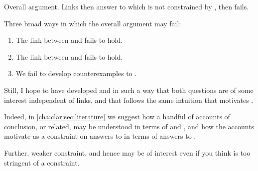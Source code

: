 \begin{note}
  Overall argument.
  Links then answer to \qWhyVnP{} which is not constrained by \qHowV{}, then \issueInclusion{} fails.

  Three broad ways in which the overall argument may fail:
  \begin{enumerate}[label=\arabic*., ref=(\arabic*), noitemsep]
  \item
    The link between \qWhyVnP{} and \qHowV{} fails to hold.
  \item
    The link between \qHowV{} and \qHow{} fails to hold.
  \item
    We fail to develop counterexamples to \issueConstraint{}.
  \end{enumerate}

  Still, I hope to have developed \qWhyVnP{} and \qHowV{} in such a way that both questions are of some interest independent of links, and that \issueConstraint{} follows the same intuition that motivates \issueInclusion{}.

  Indeed, in \autoref{cha:clar:sec:literature} we suggest how a handful of accounts of conclusion, or related, may be understood in terms of \qWhyVnP{} and \qHowV{}, and how the accounts motivate \issueConstraint{} as a constraint on answers to \qWhyVnP{} in terms of answers to \qHowV{}.

  Further, weaker constraint, and hence may be of interest even if you think \issueInclusion{} is too stringent of a constraint.
\end{note}





\subsection{\qWhyVnP{}}
\label{cha:var:sec:vars:qwhyvnp}

